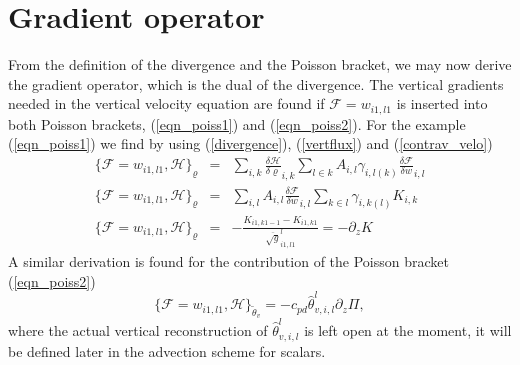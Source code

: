 \section{Gradient operator}
From the definition of the divergence and the Poisson bracket, we may now derive the gradient operator,
which is the dual of the divergence. The vertical gradients needed in the vertical velocity equation are
found if $\mathcal{F}=w_{i1,l1}$ is inserted into both Poisson brackets, (\ref{eqn_poiss1}) and
(\ref{eqn_poiss2}). For the example (\ref{eqn_poiss1}) we find by using (\ref{divergence}), (\ref{vertflux}) and (\ref{contrav_velo})
\begin{eqnarray*}
\{\mathcal{F}=w_{i1,l1},\mathcal{H}\}_\varrho&=&
\sum_{i,k}\frac{\delta\mathcal{H}}{\delta\varrho}_{i,k}\sum_{l\in k}A_{i,l}\gamma_{i,l(k)}
\frac{\delta\mathcal{F}}{\delta w}_{i,l}\\
\{\mathcal{F}=w_{i1,l1},\mathcal{H}\}_\varrho&=&
\sum_{i,l}A_{i,l}\frac{\delta\mathcal{F}}{\delta w}_{i,l}\sum_{k\in l}\gamma_{i,k(l)}K_{i,k}\\
\{\mathcal{F}=w_{i1,l1},\mathcal{H}\}_\varrho&=&-\frac{K_{i1,k1-1}-K_{i1,k1}}{\overline{\sqrt{g}}^l_{i1,l1}}
=-\partial_zK
\end{eqnarray*}
A similar derivation is found for the contribution of the Poisson bracket (\ref{eqn_poiss2})
\begin{displaymath}
 \{\mathcal{F}=w_{i1,l1},\mathcal{H}\}_{\tilde\theta_v}=-c_{pd}\hat{\theta}^l_{v,i,l}\partial_z\Pi,
\end{displaymath}
where the actual vertical reconstruction of $\hat{\theta}^l_{v,i,l}$ is left open at the moment, it will be defined later
in the advection scheme for scalars.

